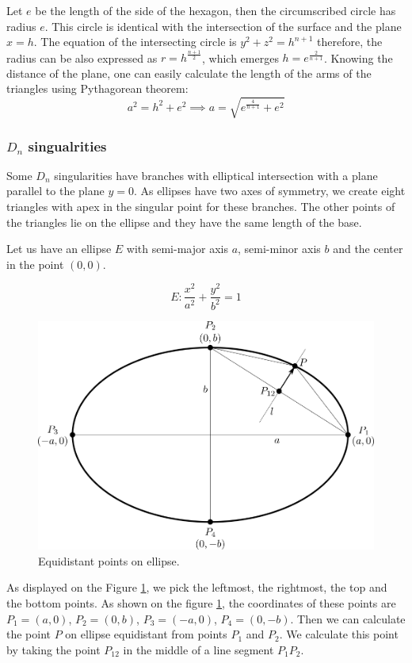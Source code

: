 Let $e$ be the length of the side of the hexagon, then the circumscribed
circle has radius $e$. This circle is identical with the intersection of
the surface and the plane $x=h$. The equation of the intersecting circle
is $y^2+z^2=h^{n+1}$ therefore, the radius can be also expressed as 
$r=h^{\frac{n+1}{2}}$, which emerges $h=e^{\frac{2}{n+1}}$. Knowing the
distance of the plane, one can easily calculate the length of the arms of
the triangles using Pythagorean theorem: 
$$a^2=h^2+e^2 \implies a = \sqrt{e^{\frac{4}{n+1}} + e^2}$$

\subsubsection*{$D_n$ singualrities}
Some $D_n$ singularities have branches with elliptical intersection with 
a plane parallel to the plane $y=0$. As ellipses have two axes of symmetry,
we create eight triangles with apex in the singular point for these branches.
The other points of the triangles lie on the ellipse and they have the same length
of the base.

Let us have an ellipse $E$ with semi-major axis $a$, semi-minor axis $b$ 
and the center in the point $(0, 0)$.

$$E: \frac{x^2}{a^2} + \frac{y^2}{b^2} = 1$$
\begin{figure}
    \centerline{\includegraphics[scale=0.5]{images/img13}}
    \caption[Equidistant points on ellipse.]
    {Equidistant points on ellipse.}
    \label{img:13}
\end{figure}
As displayed on the Figure \ref{img:13}, we pick the leftmost, the rightmost, the top
and the bottom points. As shown on the figure \ref{img:13}, the coordinates of these 
points are $P_1 = (a, 0)$, $P_2 = (0, b)$, $P_3=(-a, 0)$, $P_4 = (0, -b)$.
Then we can calculate the point $P$ on ellipse equidistant
from points $P_1$ and $P_2$. We calculate this point by taking the point $P_{12}$ 
in the middle of a line segment $P_1P_2$. 

